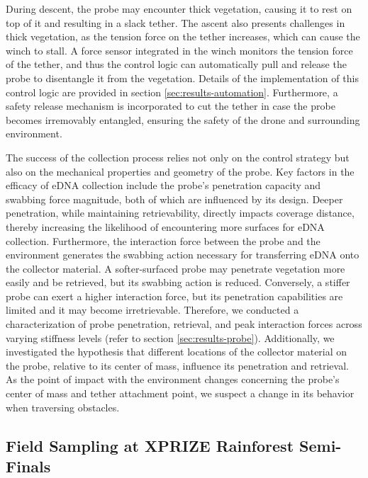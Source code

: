During descent, the probe may encounter thick vegetation, causing it to rest on top of it and resulting in a slack tether. The ascent also presents challenges in thick vegetation, as the tension force on the tether increases, which can cause the winch to stall. A force sensor integrated in the winch monitors the tension force of the tether, and thus the control logic can automatically pull and release the probe to disentangle it from the vegetation. Details of the implementation of this control logic are provided in section \ref{sec:results-automation}. Furthermore, a safety release mechanism is incorporated to cut the tether in case the probe becomes irremovably entangled, ensuring the safety of the drone and surrounding environment.

The success of the collection process relies not only on the control strategy but also on the mechanical properties and geometry of the probe. Key factors in the efficacy of \gls{eDNA} collection include the probe's penetration capacity and swabbing force magnitude, both of which are influenced by its design. Deeper penetration, while maintaining retrievability, directly impacts coverage distance, thereby increasing the likelihood of encountering more surfaces for \gls{eDNA} collection. Furthermore, the interaction force between the probe and the environment generates the swabbing action necessary for transferring \gls{eDNA} onto the collector material. A softer-surfaced probe may penetrate vegetation more easily and be retrieved, but its swabbing action is reduced. Conversely, a stiffer probe can exert a higher interaction force, but its penetration capabilities are limited and it may become irretrievable. Therefore, we conducted a characterization of probe penetration, retrieval, and peak interaction forces across varying stiffness levels (refer to section \ref{sec:results-probe}). Additionally, we investigated the hypothesis that different locations of the collector material on the probe, relative to its center of mass, influence its penetration and retrieval. As the point of impact with the environment changes concerning the probe's center of mass and tether attachment point, we suspect a change in its behavior when traversing obstacles.


\subsection{Field Sampling at XPRIZE Rainforest Semi-Finals}
\label{sec:methods-sampling}

